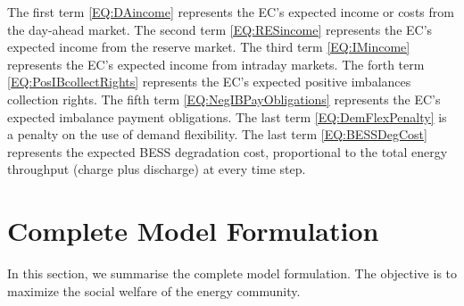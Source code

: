 \documentclass{article}
\begin{document}
The first term \eqref{EQ:DAincome} represents the EC's expected income or costs from the day-ahead market. The second term \eqref{EQ:RESincome} represents the EC's expected income from the reserve market. The third term \eqref{EQ:IMincome} represents the EC's expected income from intraday markets. The forth term \eqref{EQ:PosIBcollectRights} represents the EC's expected positive imbalances collection rights. The fifth term \eqref{EQ:NegIBPayObligations} represents the EC's expected imbalance payment obligations. The last term \eqref{EQ:DemFlexPenalty} is a penalty on the use of demand flexibility. The last term \eqref{EQ:BESSDegCost} represents the expected BESS degradation cost, 
proportional to the total energy throughput (charge plus discharge) at every time step.

\section{Complete Model Formulation}
\label{SEC:CompleteModelFormulation}

In this section, we summarise the complete model formulation. The objective is to maximize the social welfare of the energy community.
\end{document}
